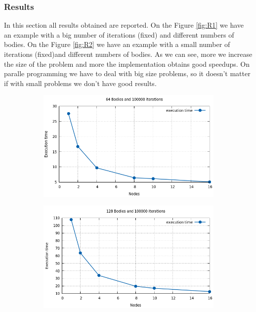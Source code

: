 \documentclass[a4paper]{article}
\begin{document}
\subsubsection{Results}
\label{sec:res}
In this section all results obtained are reported. On the Figure \ref{fig:R1} we have an example with a big number of iterations (fixed) and different numbers of bodies. On the Figure \ref{fig:R2} we have an example with a small number of iterations (fixed)and different numbers of bodies. As we can see, more we increase the size of the problem and more the implementation obtains good speedups. On paralle programming we have to deal with big size problems, so it doesn't matter if with small problems we don't have good results.

\begin{figure}[ht]
\begin{subfigure}{.5\textwidth}
  \centering
  \includegraphics[width=1\linewidth]{results/graph3}
\end{subfigure} %
\begin{subfigure}{.5\textwidth}
  \centering
  \includegraphics[width=1\linewidth]{results/graph4}

\end{subfigure}
\end{figure}
\end{document}

